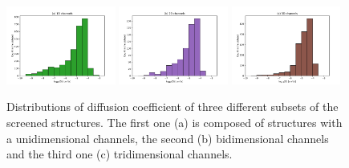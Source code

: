 \documentclass[main]{subfiles}
\begin{document}
\begin{figure}[ht]
  \centering
    \includegraphics[width=0.32\textwidth]{figures/5-diffusion/histogram_chan1D.pdf}
    \includegraphics[width=0.32\textwidth]{figures/5-diffusion/histogram_chan2D.pdf}
    \includegraphics[width=0.32\textwidth]{figures/5-diffusion/histogram_chan3D.pdf}
    \caption{ Distributions of diffusion coefficient of three different subsets of the screened structures. The first one (a) is composed of structures with a unidimensional channels, the second (b) bidimensional channels and the third one (c) tridimensional channels. }\label{fgr:hist_diffusion_chandim}
\end{figure}
\end{document}
